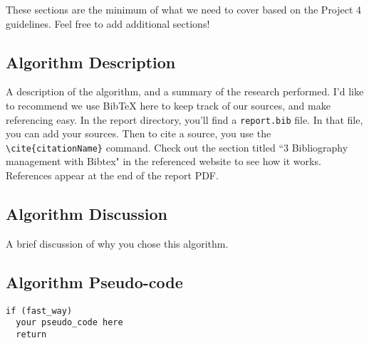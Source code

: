 \documentclass[../report/main.tex]{subfiles}
\begin{document}
These sections are the minimum of what we need to cover based on the Project 4 guidelines. Feel free to add additional sections!

\subsection*{Algorithm Description}

A description of the algorithm, and a summary of the research performed. I'd like to recommend we use BibTeX here to keep track of our sources, and make referencing easy. In the report directory, you'll find a \verb|report.bib| file. In that file, you can add your sources. Then to cite a source, you use the \verb|\cite{citationName}| command. Check out the section titled ``3 Bibliography management with Bibtex" in the referenced website to see how it works. \cite{bibtex} References appear at the end of the report PDF.

\subsection*{Algorithm Discussion}

A brief discussion of why you chose this algorithm.

\subsection*{Algorithm Pseudo-code}

\begin{verbatim}
if (fast_way)
  your pseudo_code here
  return
\end{verbatim}
\end{document}
